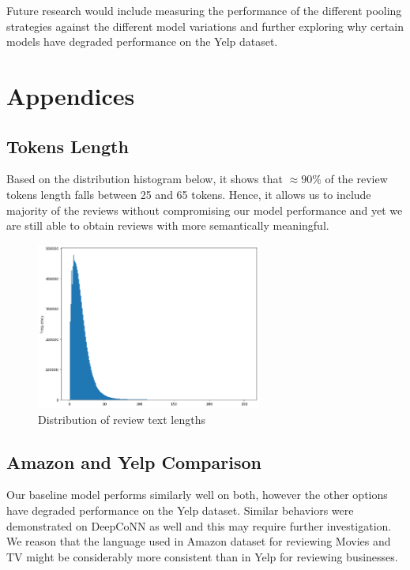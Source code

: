 \documentclass[11pt,a4paper]{article}
\begin{document}
Future research would include measuring the performance of the different pooling strategies against the different model variations and further exploring why certain models have degraded performance on the Yelp dataset.






\clearpage
\appendix
\section{Appendices}

\subsection{Tokens Length}
Based on the distribution histogram below, it shows that $\approx90$\% of the review tokens length falls between 25 and 65 tokens. Hence, it allows us to include majority of the reviews without compromising our model performance and yet we are still able to obtain reviews with more semantically meaningful.
\label{sec:appendix-review-lengths}
\begin{figure}[h]
\includegraphics[width=20em]{images/token_length_hist.png}
\caption{Distribution of review text lengths}
\end{figure}

\subsection{Amazon and Yelp Comparison}
Our baseline model performs similarly well on both, however the other options have degraded performance on the Yelp dataset. Similar behaviors were demonstrated on DeepCoNN as well and this may require further investigation. We reason that the language used in Amazon dataset for reviewing Movies and TV might be considerably more consistent than in Yelp for reviewing businesses.
\label{sec:appendix-yelp}
\end{document}

